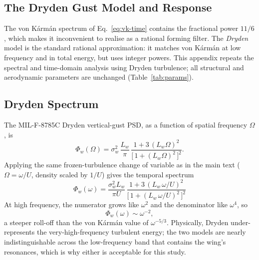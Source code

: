 \documentclass[11pt]{article}
\begin{document}
\appendix
\begin{appendices}

\section{The Dryden Gust Model and Response}
\label{app:dryden}

The von K\'arm\'an spectrum of Eq.~\eqref{eq:vk-time} contains the fractional power $11/6$,
which makes it inconvenient to realise as a rational forming filter. The \emph{Dryden} model
is the standard rational approximation: it matches von K\'arm\'an at low frequency and in
total energy, but uses integer powers. This appendix repeats the spectral and time-domain
analysis using Dryden turbulence; all structural and aerodynamic parameters are unchanged
(Table~\ref{tab:params}).

\subsection{Dryden Spectrum}
The MIL-F-8785C Dryden vertical-gust PSD, as a function of spatial frequency $\Omega$, is
\begin{equation}
\Phi_w(\Omega)=\sigma_w^2\,\frac{L_w}{\pi}\,
\frac{1+3\,(L_w\Omega)^2}{\big[\,1+(L_w\Omega)^2\,\big]^{2}} .
\label{eq:dryden-space}
\end{equation}
Applying the same frozen-turbulence change of variable as in the main text
($\Omega=\omega/U$, density scaled by $1/U$) gives the temporal spectrum
\begin{equation}
\boxed{\;\Phi_w(\omega)=\frac{\sigma_w^2 L_w}{\pi U}\,
\frac{1+3\,(L_w\,\omega/U)^2}{\big[\,1+(L_w\,\omega/U)^2\,\big]^{2}}\;}
\label{eq:dryden-time}
\end{equation}
At high frequency, the numerator grows like $\omega^2$ and the denominator like $\omega^4$, so
\begin{equation}
\Phi_w(\omega)\sim\omega^{-2},
\end{equation}
a steeper roll-off than the von K\'arm\'an value of $\omega^{-5/3}$. Physically, Dryden
under-represents the very-high-frequency turbulent energy; the two models are
nearly indistinguishable across the low-frequency band that contains the wing's resonances,
which is why either is acceptable for this study.


\end{appendices}
\end{document}
